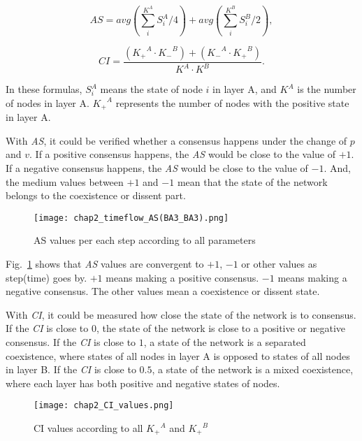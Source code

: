 \begin{equation}
AS = avg\left( {\sum\limits_i^{{K^A}} {S_i^A/4} } \right) + avg\left( {\sum\limits_i^{{K^B}} {S_i^B/2} } \right),
\end{equation}

\begin{equation}
CI = \frac{{({K_ + }^A \cdot {K_ - }^B) + ({K_ - }^A \cdot {K_ + }^B)}}{{{K^A} \cdot {K^B}}}.
\end{equation}

In these formulas, $S_i^A$ means the state of node $i$ in layer A, and $K^A$ is the number of nodes in layer A. ${K_ + }^A$ represents the number of nodes with the positive state in layer A.   

With \textit{AS}, it could be verified whether a consensus happens under the change of $p$ and $v$.  If a positive consensus happens, the \textit{AS} would be close to the value of $+1$. If a negative consensus happens, the \textit{AS} would be close to the value of $-1$. And, the medium values between $+1$ and $-1$ mean that the state of the network belongs to the coexistence or dissent part.

\begin{figure}[!htb]
	\centering
	\texttt{[image: chap2\_timeflow\_AS(BA3\_BA3).png]}
	\caption{AS values per each step according to all parameters}
	\label{chap2_timeflow_AS(BA3_BA3)}
\end{figure}

Fig.~\ref{chap2_timeflow_AS(BA3_BA3)} shows that \textit{AS} values are convergent to $+1$, $-1$ or other values as step(time) goes by. $+1$ means making a positive consensus. $-1$ means making a negative consensus. The other values mean a coexistence or dissent state. 

With \textit{CI}, it could be measured how close the state of the network is to consensus. If the \textit{CI} is close to $0$, the state of the network is close to a positive or negative consensus. If the \textit{CI} is close to $1$, a state of the network is a separated coexistence, where states of all nodes in layer A is opposed to states of all nodes in layer B. If the \textit{CI} is close to $0.5$, a state of the network is a mixed coexistence, where each layer has both positive and negative states of nodes.

\begin{figure}[!htb]
	\centering
	\texttt{[image: chap2\_CI\_values.png]}
	\caption{CI values according to all ${K_ + }^A$ and ${K_ + }^B$  }
	\label{chap2_CI_values}
\end{figure}


